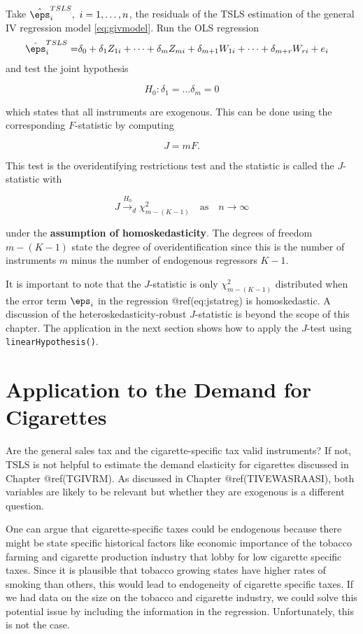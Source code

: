 \documentclass[
  letterpaper,
  DIV=11,
  numbers=noendperiod]{scrreprt}
\theoremstyle{definition}
\theoremstyle{plain}
\theoremstyle{plain}
\theoremstyle{remark}
\begin{document}
{Take \(\hat{\eps}_i^{TSLS},\ i = 1,\dots,n\), the residuals of the TSLS
estimation of the general IV regression model \eqref{eq:givmodel}. Run
the OLS regression \begin{align}
\hat{\eps}_i^{TSLS} =& \delta_0 + \delta_1 Z_{1i} + \dots + \delta_m Z_{mi} + \delta_{m+1} W_{1i} + \dots + \delta_{m+r} W_{ri} + e_i \label{eq:jstatreg}
\end{align} and test the joint hypothesis

\[
H_0: \delta_1 = \dots \delta_{m} = 0
\]

which states that all instruments are exogenous. This can be done using
the corresponding \(F\)-statistic by computing

\[
J = m  F.
\]

This test is the overidentifying restrictions test and the statistic is
called the \(J\)-statistic with

\[
J \overset{H_0}{\to}_d \chi^2_{m-(K-1)}\quad\text{as}\quad n\to\infty
\]

under the \textbf{assumption of homoskedasticity}. The degrees of
freedom \(m-(K-1)\) state the degree of overidentification since this is
the number of instruments \(m\) minus the number of endogenous
regressors \(K-1\).

It is important to note that the \(J\)-statistic is only
\(\chi^2_{m-(K-1)}\) distributed when the error term \(\eps_i\) in the
regression @ref(eq:jstatreg) is homoskedastic. A discussion of the
heteroskedasticity-robust \(J\)-statistic is beyond the scope of this
chapter. The application in the next section shows how to apply the
\(J\)-test using \texttt{linearHypothesis()}.

\hypertarget{attdfc}{%
\section{Application to the Demand for Cigarettes}\label{attdfc}}

Are the general sales tax and the cigarette-specific tax valid
instruments? If not, TSLS is not helpful to estimate the demand
elasticity for cigarettes discussed in Chapter @ref(TGIVRM). As
discussed in Chapter @ref(TIVEWASRAASI), both variables are likely to be
relevant but whether they are exogenous is a different question.

One can argue that cigarette-specific taxes could be endogenous because
there might be state specific historical factors like economic
importance of the tobacco farming and cigarette production industry that
lobby for low cigarette specific taxes. Since it is plausible that
tobacco growing states have higher rates of smoking than others, this
would lead to endogeneity of cigarette specific taxes. If we had data on
the size on the tobacco and cigarette industry, we could solve this
potential issue by including the information in the regression.
Unfortunately, this is not the case.

}
\end{document}
